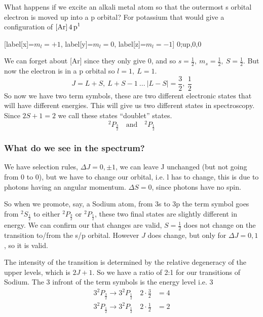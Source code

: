 \documentclass{article}
\begin{document}
    What happens if we excite an alkali metal atom so that the outermost s orbital electron is moved up into a p orbital?
    For potassium that would give a configuration of $\ce{[Ar] 4p^1}$ 
    \begin{center}
        \begin{modiagram}[style=square, AO-width=20pt]
             [label[x]={$m_l=+1$}, label[y]={$m_l=0$}, label[z]={$m_l=-1$}] {0;up,0,0}
        \end{modiagram}
    \end{center}
    We can forget about [Ar] since they only give 0, and so $s =\frac{1}{2},\ m_s=\frac{1}{2},\ S=\frac{1}{2}$.
    But now the electron is in a p orbital so $l=1,\ L=1$. 
    $$J = L+S,\ L+S-1\ ...\ |L-S| = \frac{3}{2},\ \frac{1}{2}$$
    So now we have two term symbols, these are two different electronic states that will have different energies.
    This will give us two different states in spectroscopy. Since $2S+1 = 2$ we call these states ``doublet'' states.
    {\large $$^2P_\frac{3}{2} \quad \text{and} \quad ^2P_\frac{1}{2}$$}

    \subsubsection{What do we see in the spectrum?}
    We have selection rules, $\Delta J = 0, \pm 1$, we can leave J unchanged (but not going from 0 to 0), but we have to change our orbital, i.e. l has to change, 
    this is due to photons having an angular momentum. $\Delta S = 0$, since photons have no spin.
    \newline

    So when we promote, say, a Sodium atom, from 3s to 3p the term symbol goes from $^2S_\frac{1}{2}$ to either
    $^2P_\frac{3}{2}$ or $^2P_\frac{1}{2}$, these two final states are slightly different in energy. 
    We can confirm our that changes are valid, $S = \frac{1}{2}$ does not change on the transition to/from
    the s/p orbital. However $J$ does change, but only for $\Delta J = 0, 1$, so it is valid. 

    The intensity of the transition is determined by the relative degeneracy of the upper levels, which is 
    $2J+1$. So we have a ratio of 2:1 for our transitions of Sodium. The 3 infront of the term symbols is 
    the energy level i.e. 3 
    \begin{align*}
        3^2P_\frac{3}{2} \rightarrow 3^2P_\frac{1}{2} \quad 2\cdot \frac{3}{2} &= 4\\
        3^2P_\frac{1}{2} \rightarrow 3^2P_\frac{1}{2} \quad 2\cdot \frac{1}{2} &= 2
    \end{align*}
\end{document}

